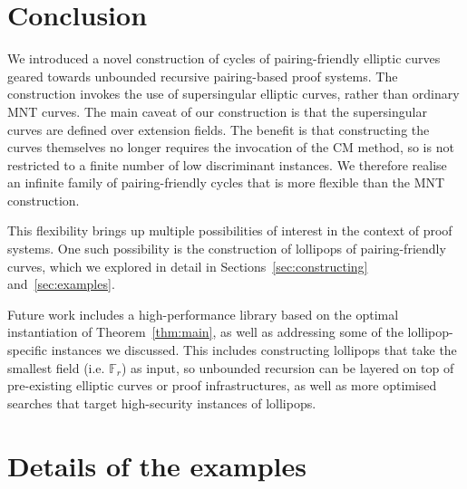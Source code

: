 \documentclass[version=preprint]{iacrcc}
\newif\iffullversion
\newcommand{\F}{\mathbb{F}}
\begin{document}
\section{Conclusion}\label{sec: conclusion}

We introduced a novel construction of cycles of pairing-friendly elliptic curves geared towards unbounded recursive pairing-based proof systems. The construction invokes the use of supersingular elliptic curves, rather than ordinary MNT curves. The main caveat of our construction is that the supersingular curves are defined over extension fields. The benefit is that constructing the curves themselves no longer requires the invocation of the CM method, so is not restricted to a finite number of low discriminant instances. We therefore realise an infinite family of pairing-friendly cycles that is more flexible than the MNT construction. 

This flexibility brings up multiple possibilities of interest in the context of proof systems. One such possibility is the construction of lollipops of pairing-friendly curves, which we explored in detail in Sections~\ref{sec:constructing} and~\ref{sec:examples}. 

Future work includes a high-performance library based on the optimal instantiation of Theorem~\ref{thm:main}, as well as addressing some of the lollipop-specific instances we discussed. This includes constructing lollipops that take the smallest field (i.e. $\F_r$) as input, so unbounded recursion can be layered on top of pre-existing elliptic curves or proof infrastructures, as well as more optimised searches that target high-security instances of lollipops.


\iffullversion
    \subsubsection{Acknowledgements.} Part of this work was done while Gaurish was an intern at Microsoft Research. Thanks to Patrick Longa, Andrew Sutherland, and Allan Steel for their technical assistance. Thanks to Michael Naehrig and Greg Zaverucha for several discussions during the preparation of this work. 
\fi


\appendix

\section{Details of the examples}\label{sec:appendix}
\end{document}
